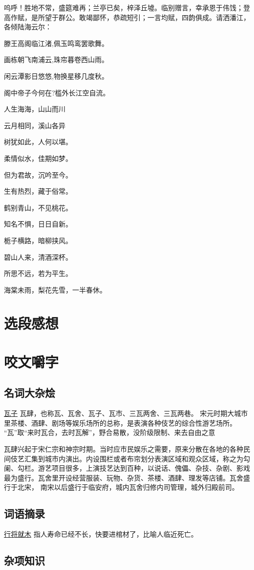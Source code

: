 \documentclass[UTF8,oneside]{ctexbook}
\begin{document}
呜呼！胜地不常，盛筵难再；兰亭已矣，梓泽丘墟。临别赠言，幸承恩于伟饯；登高作赋，是所望于群公。敢竭鄙怀，恭疏短引；一言均赋，四韵俱成。请洒潘江，各倾陆海云尔：

\quad \quad 滕王高阁临江渚,佩玉鸣鸾罢歌舞。

\quad \quad 画栋朝飞南浦云,珠帘暮卷西山雨。

\quad \quad 闲云潭影日悠悠,物换星移几度秋。

\quad \quad 阁中帝子今何在?槛外长江空自流。

\mfApache \quad 人生海海，山山而川

\mfApache \quad 云月相同，溪山各异

\mfApache \quad 树犹如此，人何以堪。

\mfApache \quad 柔情似水，佳期如梦。

\mfApache \quad 但为君故，沉吟至今。

\mfApache \quad 生有热烈，藏于俗常。

\mfApache \quad 鹤别青山，不见桃花。

\mfApache \quad 知名不惧，日日自新。

\mfApache \quad 栀子横路，暗柳挟风。

\mfApache \quad 碧山人来，清酒深杯。

\mfApache \quad 所思不远，若为平生。

\mfApache \quad 海棠未雨，梨花先雪，一半春休。

\mfApache \quad 
\chapter{选段感想}

\chapter{咬文嚼字}
\section{名词大杂烩}
\mfApache \quad \underline{瓦子} \quad 瓦肆，也称瓦、瓦舍、瓦子、瓦市、三瓦两舍、三瓦两巷。
宋元时期大城市里茶楼、酒肆、剧场等娱乐场所的总称，是表演各种伎艺的综合性游艺场所。
“瓦”取“来时瓦合，去时瓦解”，野合易散，没阶级限制、来去自由之意

瓦肆兴起于宋仁宗和神宗时期。当时应市民娱乐之需要，原来分散在各地的各种民间伎艺汇集到城市内演出。内设围栏或者布帘划分表演区域和观众区域，称之为勾阑、勾栏。游艺项目很多，上演技艺达到百种，以说话、傀儡、杂技、杂剧、影戏最为盛行。瓦舍里开设经营服装、玩物、杂货、茶楼、酒肆、理发等店铺。瓦舍盛行于北宋，
南宋以后盛行于临安府，城内瓦舍归修内司管理，城外归殿前司。

\section{词语摘录}
\mfApache \quad \underline{行将就木} \quad 
指人寿命已经不长，快要进棺材了，比喻人临近死亡。

\mfApache \quad 

\section{杂项知识}
\end{document}

